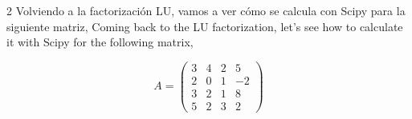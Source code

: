 

 

\begin{paracol}{2}
Volviendo a la factorización LU, vamos a ver cómo se calcula con Scipy para la siguiente matriz,	
\switchcolumn
Coming back to the LU factorization, let's see how to calculate it with Scipy for the following matrix,
\end{paracol}
\begin{equation*}
A=\begin{pmatrix}
3& 4& 2&5\\
2& 0& 1& -2\\
3& 2& 1& 8\\
5& 2& 3& 2
\end{pmatrix} 
\end{equation*}

